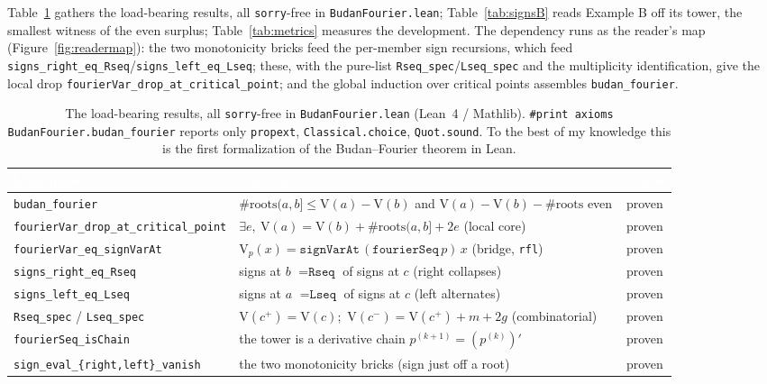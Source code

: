 \documentclass[11pt]{article}
\newcommand{\lean}[1]{\texttt{#1}}
\newcommand{\V}{\mathrm{V}}
\begin{document}
Table~\ref{tab:results} gathers the load-bearing results, all \lean{sorry}-free in
\lean{BudanFourier.lean}; Table~\ref{tab:signsB} reads Example B off its tower, the smallest witness of
the even surplus; Table~\ref{tab:metrics} measures the development. The dependency runs as the
reader's map (Figure~\ref{fig:readermap}): the two monotonicity bricks feed the per-member sign
recursions, which feed \lean{signs\_right\_eq\_Rseq}/\lean{signs\_left\_eq\_Lseq}; these, with the
pure-list \lean{Rseq\_spec}/\lean{Lseq\_spec} and the multiplicity identification, give the local
drop \lean{fourierVar\_drop\_at\_critical\_point}; and the global induction over critical points
assembles \lean{budan\_fourier}.

\begin{table}[H]
  \centering\small
  \begin{tabular}{@{}llc@{}}
    \toprule
    \rowcolor{ggteal}
    \textcolor{white}{\textbf{Lean name}} & \textcolor{white}{\textbf{Statement}} & \textcolor{white}{\textbf{Status}} \\
    \midrule
    \rowcolor{ggband}
    \lean{budan\_fourier} & $\#\mathrm{roots}(a,b]\le \V(a){-}\V(b)$ and $\V(a){-}\V(b){-}\#\mathrm{roots}$ even & proven \\
    \lean{fourierVar\_drop\_at\_critical\_point} & $\exists e,\ \V(a)=\V(b)+\#\mathrm{roots}(a,b]+2e$ (local core) & proven \\
    \rowcolor{ggband}
    \lean{fourierVar\_eq\_signVarAt} & $\V_p(x)=\lean{signVarAt}\,(\lean{fourierSeq}\,p)\,x$ (bridge, \lean{rfl}) & proven \\
    \lean{signs\_right\_eq\_Rseq} & signs at $b$ $=\lean{Rseq}$ of signs at $c$ (right collapses) & proven \\
    \rowcolor{ggband}
    \lean{signs\_left\_eq\_Lseq} & signs at $a$ $=\lean{Lseq}$ of signs at $c$ (left alternates) & proven \\
    \lean{Rseq\_spec} / \lean{Lseq\_spec} & $\V(c^+){=}\V(c)$;\ $\V(c^-){=}\V(c^+){+}m{+}2g$ (combinatorial) & proven \\
    \rowcolor{ggband}
    \lean{fourierSeq\_isChain} & the tower is a derivative chain $p^{(k+1)}=(p^{(k)})'$ & proven \\
    \lean{sign\_eval\_\{right,left\}\_vanish} & the two monotonicity bricks (sign just off a root) & proven \\
    \bottomrule
  \end{tabular}
  \caption{The load-bearing results, all \lean{sorry}-free in \lean{BudanFourier.lean} (Lean~4 /
  Mathlib). \lean{\#print axioms BudanFourier.budan\_fourier} reports only \lean{propext},
  \lean{Classical.choice}, \lean{Quot.sound}. To the best of my knowledge this is the first
  formalization of the Budan--Fourier theorem in Lean.}
  \label{tab:results}
\end{table}
\end{document}
